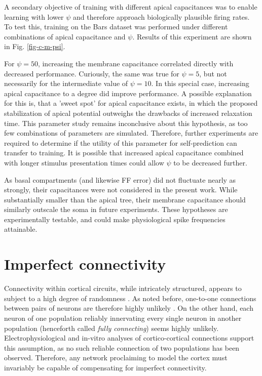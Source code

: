 A secondary objective of training with different apical capacitances was to enable learning with lower $\psi$ and
therefore approach biologically plausible firing rates. To test this, training on the Bars dataset was performed under
different combinations of apical capacitance and $\psi$. Results of this experiment are shown in Fig. \ref{fig-c-m-psi}.

For $\psi=50$, increasing the membrane capacitance correlated directly with decreased performance. Curiously, the same
was true for $\psi=5$, but not necessarily for the intermediate value of $\psi=10$. In this special case, increasing
apical capacitance to a degree did improve performance. A possible explanation for this is, that a 'sweet spot' for
apical capacitance exists, in which the proposed stabilization of apical potential outweighs the drawbacks of increased
relaxation time. This parameter study remains inconclusive about this hypothesis, as too few combinations of parameters
are simulated. Therefore, further experiments are required to determine if the utility of this parameter for
self-prediction can transfer to training. It is possible that increased apical capacitance combined with longer stimulus
presentation times could allow $\psi$ to be decreased further. 


As basal compartments (and likewise FF error) did not fluctuate nearly as strongly, their capacitances were not
considered in the present work. While substantially smaller than the apical tree, their membrane capacitance should
similarly outscale the soma in future experiments. These hypotheses are experimentally testable, and could make
physiological spike frequencies attainable.


\section{Imperfect connectivity}\label{sec-dropout}

Connectivity within cortical circuits, while intricately structured, appears to subject to a high degree of randomness
\citep{potjans2014cell}. As noted before, one-to-one connections between pairs of neurons are therefore highly unlikely
\citep{whittington2019theories}. On the other hand, each neuron of one population reliably innervating every single
neuron in another population (henceforth called \textit{fully connecting}) seems highly unlikely. Electrophysiological
\citep{thomson2002synaptic} and in-vitro \citep{binzegger2004quantitative} analyses of cortico-cortical connections
support this assumption, as no such reliable connection of two populations has been observed. Therefore, any network
proclaiming to model the cortex must invariably be capable of compensating for imperfect connectivity.

